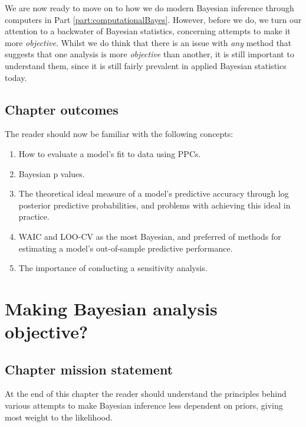 \documentclass[11pt,fullpage]{book}
\begin{document}
We are now ready to move on to how we do modern Bayesian inference through computers in Part \ref{part:computationalBayes}. However, before we do, we turn our attention to a backwater of Bayesian statistics, concerning attempts to make it more \textit{objective}. Whilst we do think that there is an issue with \textit{any} method that suggests that one analysis is more \textit{objective} than another, it is still important to understand them, since it is still fairly prevalent in applied Bayesian statistics today.

\section{Chapter outcomes}
The reader should now be familiar with the following concepts:

\begin{enumerate}
\item How to evaluate a model's fit to data using PPCs.
\item Bayesian p values.
\item The theoretical ideal measure of a model's predictive accuracy through log posterior predictive probabilities, and problems with achieving this ideal in practice.
\item WAIC and LOO-CV as the most Bayesian, and preferred of methods for estimating a model's out-of-sample predictive performance.
\item The importance of conducting a sensitivity analysis. 
\end{enumerate}

\chapter{Making Bayesian analysis objective?}\label{chap:ObjectiveBayes}
\section{Chapter mission statement}
At the end of this chapter the reader should understand the principles behind various attempts to make Bayesian inference less dependent on priors, giving most weight to the likelihood.
\end{document}
